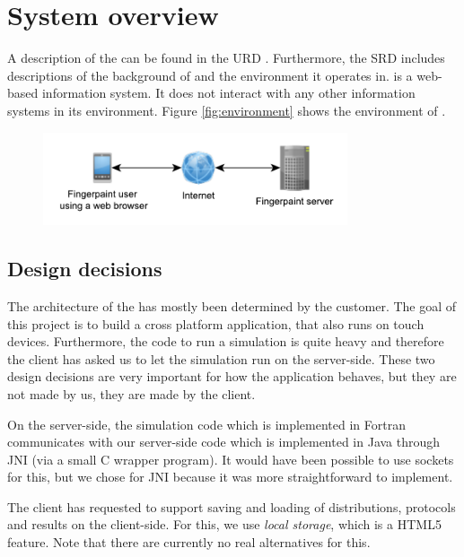\chapter{System overview}
\label{chap:systoverview}
A description of the \applicationname{} can be found in the URD \cite{urd}. Furthermore, the SRD \cite{srd} includes descriptions of the background of \projectname{} and the environment it operates in.
\projectname{} is a web-based information system. It does not interact with any other information systems in its environment. Figure \ref{fig:environment} shows the environment of \projectname{}.

\begin{figure}[h!]
\begin{center}
\includegraphics[keepaspectratio=true,width=0.8\textwidth]{Environment.pdf}
\end{center}
\end{figure}

\section{Design decisions}
\label{sec:designdecisions}
The architecture of the \applicationname{} has mostly been determined by the customer. The goal of this project is to build a cross platform application, that also runs on touch devices. Furthermore, the code to run a simulation is quite heavy and therefore the client has asked us to let the simulation run on the server-side. These two design decisions are very important for how the application behaves, but they are not made by us, they are made by the client.

On the server-side, the simulation code which is implemented in Fortran communicates with our server-side code which is implemented in Java through JNI (via a small C wrapper program). It would have been possible to use sockets for this, but we chose for JNI because it was more straightforward to implement.

The client has requested to support saving and loading of distributions, protocols and results on the client-side. For this, we use \emph{local storage}, which is a HTML5 feature. Note that there are currently no real alternatives for this.